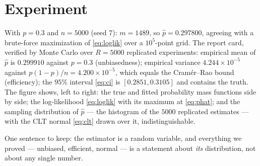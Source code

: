\documentclass[11pt]{article}
\newcommand{\phat}{\hat{p}}
\begin{document}
\section{Experiment}

With $p = 0.3$ and $n = 5000$ (seed 7): $m = 1489$, so
$\phat = 0.297800$, agreeing with a brute-force maximization of
\eqref{eq:loglik} over a $10^{5}$-point grid. The report card, verified
by Monte Carlo over $R = 5000$ replicated experiments: empirical mean of
$\phat$ is $0.299910$ against $p = 0.3$ (unbiasedness); empirical
variance $4.244\times10^{-5}$ against
$p(1-p)/n = 4.200\times10^{-5}$, which equals the Cram\'er--Rao bound
(efficiency); the $95\%$ interval \eqref{eq:ci} is $[0.2851, 0.3105]$
and contains the truth. The figure shows, left to right: the true and
fitted probability mass functions side by side; the log-likelihood
\eqref{eq:loglik} with its maximum at \eqref{eq:phat}; and the sampling
distribution of $\phat$ --- the histogram of the $5000$ replicated
estimates --- with the CLT normal \eqref{eq:clt} drawn over it,
indistinguishable.

One sentence to keep: the estimator is a random variable, and everything
we proved --- unbiased, efficient, normal --- is a statement about
\emph{its} distribution, not about any single number.
\end{document}
